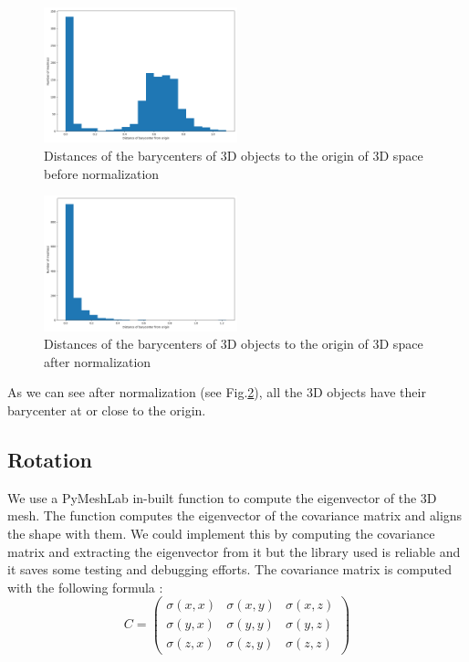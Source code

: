 \documentclass[10pt,twocolumn,letterpaper]{article}
\begin{document}
\begin{figure}[h!]
\begin{center}
  \includegraphics[width=0.5\textwidth]{picture/Initial barycenter}
  \caption{Distances of the barycenters of 3D objects to the origin of 3D space before normalization}
  \label{fig:barycenter-before}
  \end{center}
\end{figure}

\begin{figure}[h!]
\begin{center}
  \includegraphics[width=0.5\textwidth]{picture/Normalised barycenter}
  \caption{Distances of the barycenters of 3D objects to the origin of 3D space after normalization}
  \label{fig:barycenter-after}
  \end{center}
\end{figure}

As we can see after normalization (see Fig.\ref{fig:barycenter-after}),  all the 3D objects have their barycenter at or close to the origin.

\subsection{Rotation}

	We use a PyMeshLab in-built function to compute the eigenvector of the 3D mesh. The function computes the eigenvector of the covariance matrix and aligns the shape with them. We could implement this by computing the covariance matrix and extracting the eigenvector from it but the library used is reliable and it saves some testing and debugging efforts. The covariance matrix is computed with the following formula :
	$$ C = \begin{pmatrix}
   \sigma(x,x) & \sigma(x,y) & \sigma(x,z) \\
   \sigma(y,x) & \sigma(y,y) & \sigma(y,z) \\
   \sigma(z,x) & \sigma(z,y) & \sigma(z,z)
\end{pmatrix} $$
\end{document}

